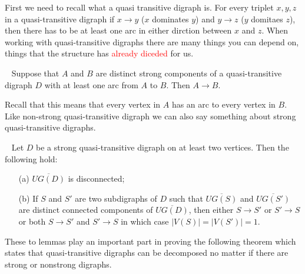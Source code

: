 First we need to recall what a quasi transitive digraph is. 
For every triplet $x,y,z$ in a quasi-transitive digraph if $x\rightarrow y$ ($x$ dominates $y$) and $y\rightarrow z$ ($y$ domitaes $z$), then there has to be at least one arc in either dirction between $x$ and $z$. 
When working with quasi-transitive digraphs there are many things you can depend on, things that the structure has \textcolor{red}{already diceded} for us.
\begin{lemma}~\cite{banggutin}
    Suppose that $A$ and $B$ are distinct strong components of a quasi-transitive digraph $D$ with at least one arc from $A$ to $B$. Then $A\rightarrow B$.
    \label{lemma:dominatingset}
\end{lemma}
Recall that this means that every vertex in $A$ has an arc to every vertex in $B$.
Like non-strong quasi-transitive digraph we can also say something about strong quasi-transitive digraphs.
\begin{lemma}~\cite{banggutin,bangJGT2}
    Let $D$ be a strong quasi-transitive digraph on at least two vertices. Then the following hold:
    \begin{itemize}
        \item[(a)] $\overline{UG(D)}$ is disconnected;
        \item[(b)] If $S$ and $S'$ are two subdigraphs of $D$ such that $\overline{UG(S)}$ and $\overline{UG(S')}$ are distinct connected components of $\overline{UG(D)}$, then either $S\rightarrow S'$ or $S'\rightarrow S$ or both $S\rightarrow S'$ and $S'\rightarrow S$ in which case $|V(S)|=|V(S')|=1$. 
    \end{itemize} 
    \label{lemma:underlyinggraph}
\end{lemma}
These to lemmas play an important part in proving the following theorem which states that quasi-transitive digraphs can be decomposed no matter if there are strong or nonstrong digraphs. 

